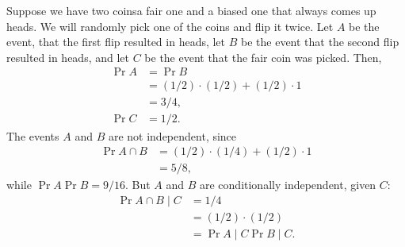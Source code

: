 \starred
Suppose we have two coins\dash a fair one and a biased one that always comes up heads.
We will randomly pick one of the coins and flip it twice.
Let $A$ be the event, that the first flip resulted in heads, let $B$ be the event that the second flip resulted in heads, and let $C$ be the event that the fair coin was picked.
Then,
\begin{align*}
    \Pr{A} &= \Pr{B} \\
    &= (1/2)\cdot(1/2)+(1/2)\cdot1 \\
    &= 3/4, \\
    \Pr{C} &= 1/2.
\end{align*}
The events $A$ and $B$ are not independent, since
\begin{align*}
    \Pr{A\cap B} &= (1/2)\cdot(1/4)+(1/2)\cdot1 \\
    &= 5/8,
\end{align*}
while $\Pr{A}\Pr{B}=9/16$.
But $A$ and $B$ are conditionally independent, given $C$:
\begin{align*}
    \Pr{A\cap B\mid C} &= 1/4 \\
    &= (1/2)\cdot(1/2) \\
    &= \Pr{A\mid C}\Pr{B\mid C}.
\end{align*}
